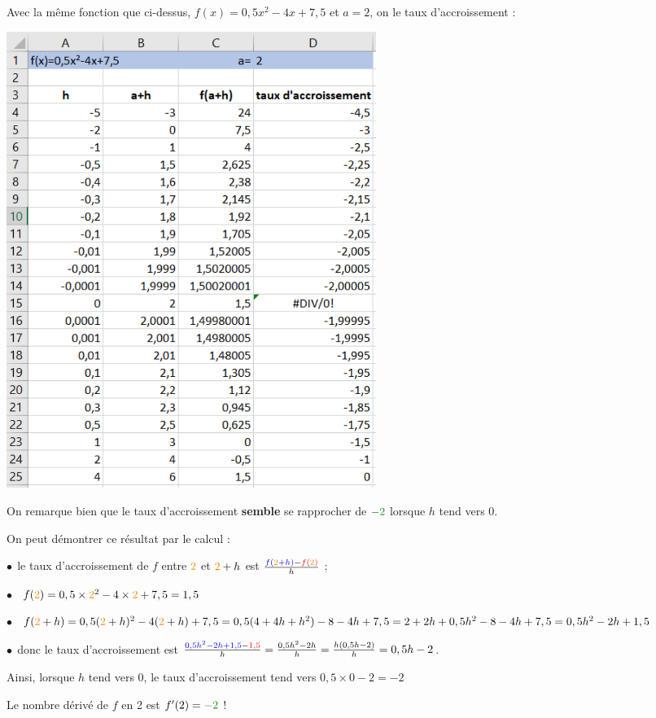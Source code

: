 \documentclass[a4paper,11pt]{article}
\begin{document}
\begin{clog}
Avec la même fonction que ci-dessus, $f(x)=0,5x^2-4x+7,5$ et $a=2$, on  le taux d'accroissement :
\begin{center}
	\includegraphics[width=12cm]{chap07_tab_derive}
\end{center}
On remarque bien que le taux d'accroissement \textbf{semble} se rapprocher de $\textcolor{ForestGreen}{-2}$ lorsque $h$ tend vers 0.

On peut démontrer ce résultat par le calcul :

$\bullet~~$le taux d'accroissement de $f$ entre $\textcolor{orange}{2}$ et $\textcolor{orange}{2}+h$ est $\frac{\textcolor{blue}{ f(\textcolor{orange}{2}+h)}-\textcolor{red}{f(\textcolor{orange}{2})}}{h}$ ;

$\bullet~~$\color{red} $f(\textcolor{orange}{2})=0,5 \times \textcolor{orange}{2}^2-4 \times \textcolor{orange}{2} +7,5=1,5$

\color{black}$\bullet~~$\color{blue}$f(\textcolor{orange}{2}+h)=0,5(\textcolor{orange}{2}+h)^2-4(\textcolor{orange}{2}+h)+7,5=0,5(4+4h+h^2)-8-4h+7,5=2+2h+0,5h^2-8-4h+7,5=0,5h^2-2h+1,5$

\color{black}$\bullet~~$donc le taux d'accroissement est $\frac{\textcolor{blue}{0,5h^2-2h+1,5}-\textcolor{red}{1,5}}{h}=\frac{0,5h^2-2h}{h}=\frac{h(0,5h-2)}{h}=0,5h-2$.

\smallskip

Ainsi, lorsque $h$ tend vers 0, le taux d'accroissement tend vers $0,5 \times 0 -2=-2$

Le nombre dérivé de $f$ en 2 est $f'(2)=\textcolor{ForestGreen}{-2}$ !
\end{clog}	
\end{document}
